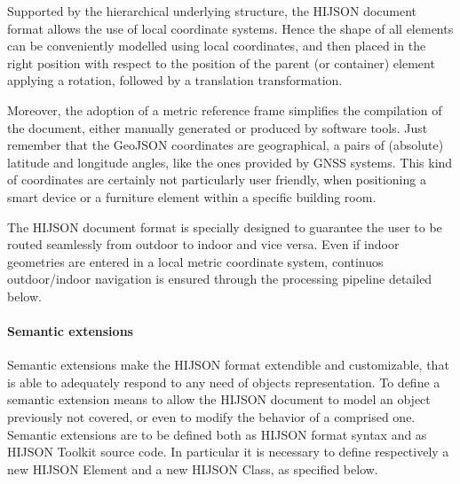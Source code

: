 Supported by the hierarchical underlying structure, the HIJSON document format allows 
the use of local coordinate systems. Hence the shape of all elements can 
be conveniently modelled using local coordinates, and then placed in the right position 
with respect to the position of the parent (or container) element applying a rotation, followed by a
translation transformation.

Moreover, the adoption of a metric reference frame simplifies the compilation
of the document, either manually generated or produced by software tools. Just
remember that the GeoJSON coordinates are geographical, a pairs of (absolute)
latitude and longitude angles, like the ones provided by GNSS systems. This
kind of coordinates  are certainly not particularly user friendly, when
positioning a smart device or a furniture element within a specific building
room.

The HIJSON document format is specially designed to guarantee the user to be routed seamlessly 
from outdoor to indoor and vice versa. Even if indoor geometries are entered in a local metric 
coordinate system, continuos outdoor/indoor navigation is ensured through the processing pipeline
detailed below.

\paragraph*{Semantic extensions}\label{semantic-extensions}

Semantic extensions make the HIJSON format extendible and customizable, that
is able to adequately respond to any need of objects representation. To define a
semantic extension means to allow the HIJSON document to model an object
previously not covered, or even to modify the behavior of a comprised one.
Semantic extensions are to be defined both as HIJSON format syntax and as
HIJSON Toolkit source code. In particular it is necessary to define respectively
a new HIJSON Element and a new HIJSON Class, as specified below.



